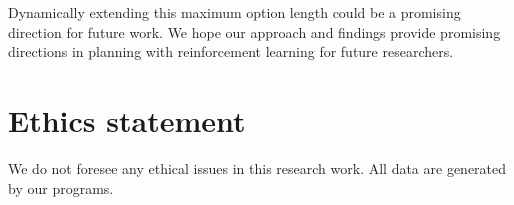 {Dynamically extending this maximum option length could be a promising direction for future work.
}
We hope our approach and findings provide promising directions in planning with reinforcement learning for future researchers.



\section*{Ethics statement}

We do not foresee any ethical issues in this research work. All data are generated by our programs.



